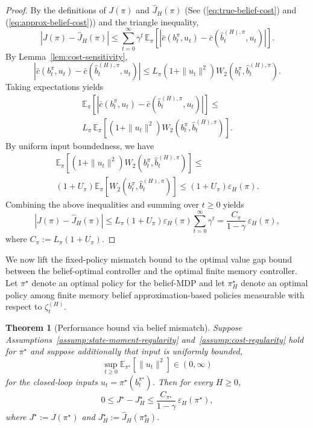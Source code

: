 \documentclass[letterpaper, 10 pt, conference]{ieeeconf}
\newtheorem{theorem}{Theorem}
\begin{document}
\begin{proof}
By the definitions of $J(\pi)$ and $\hat J_H(\pi)$ (See (\ref{eq:true-belief-cost}) and (\ref{eq:approx-belief-cost})) and the triangle inequality,
\begin{equation}
\left|J(\pi)-\hat J_H(\pi)\right|
\le
\sum_{t=0}^{\infty}
\gamma^t\,
\mathbb{E}_\pi\!\left[
\left|\bar c(b_t^\pi,u_t)-\bar c(\hat b_t^{(H),\pi},u_t)\right|
\right].
\end{equation}
By Lemma~\ref{lem:cost-sensitivity},
\begin{equation}
\left|\bar c(b_t^\pi,u_t)-\bar c(\hat b_t^{(H),\pi},u_t)\right|
\le
L_\pi\left(1+\|u_t\|^2\right)
W_2\!\left(b_t^\pi,\hat b_t^{(H),\pi}\right).
\end{equation}
Taking expectations yields
\begin{multline}
\mathbb{E}_\pi\!\left[
\left|\bar c(b_t^\pi,u_t)-\bar c(\hat b_t^{(H),\pi},u_t)\right|
\right]
\le \\
L_\pi\,
\mathbb{E}_\pi\!\left[
\left(1+\|u_t\|^2\right)
W_2\!\left(b_t^\pi,\hat b_t^{(H),\pi}\right)
\right].
\end{multline}
By uniform input boundedness, we have
\begin{multline}
\mathbb{E}_\pi\!\left[
\left(1+\|u_t\|^2\right)
W_2\!\left(b_t^\pi,\hat b_t^{(H),\pi}\right)
\right]
\le \\
\left(1+U_\pi\right)
\mathbb{E}_\pi\!\left[
W_2\!\left(b_t^\pi,\hat b_t^{(H),\pi}\right)
\right]
\le
\left(1+U_\pi\right)\varepsilon_H(\pi).
\end{multline}
Combining the above inequalities and summing over $t\ge 0$ yields
\begin{equation}
\left|J(\pi)-\hat J_H(\pi)\right|
\le
L_\pi\left(1+U_\pi\right)
\varepsilon_H(\pi)
\sum_{t=0}^{\infty}\gamma^t
=
\frac{C_\pi}{1-\gamma}\,\varepsilon_H(\pi),
\end{equation}
where $C_\pi:=L_\pi\left(1+U_\pi\right)$.
\end{proof}

We now lift the fixed-policy mismatch bound to the optimal value gap bound between the belief-optimal controller and the optimal finite memory controller.
Let $\pi^\star$ denote an optimal policy for the belief-MDP and let $\pi_H^\star$ denote an optimal policy among finite memory belief approximation-based policies measurable with respect to $\zeta_t^{(H)}$.

\begin{theorem}[Performance bound via belief mismatch]
\label{thm:value-gap}
Suppose Assumptions~\ref{assump:state-moment-regularity} and~\ref{assump:cost-regularity} hold for $\pi^\star$ and suppose additionally that input is uniformly bounded,
\begin{equation}
\sup_{t\ge 0}\mathbb{E}_{\pi^\star}[\|u_t\|^2]\in (0, \infty)
\end{equation}
for the closed-loop inputs $u_t=\pi^\star(b_t^{\pi^\star})$.
Then for every $H\ge 0$,
\begin{equation}
0\le J^\star-J_H^\star
\le
\frac{C_{\pi^\star}}{1-\gamma}\,\varepsilon_H(\pi^\star),
\end{equation}
where $J^\star:=J(\pi^\star)$ and $J_H^\star:=\hat J_H(\pi_H^\star)$.
\end{theorem}
\end{document}
